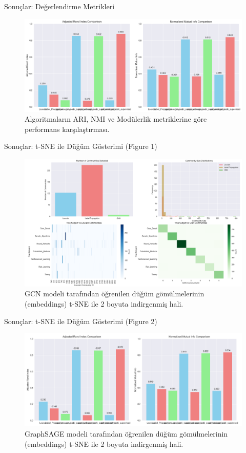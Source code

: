 \documentclass{beamer}
\begin{document}
\begin{frame}{Sonuçlar: Değerlendirme Metrikleri}
    \begin{figure}
        \includegraphics[width=\textwidth]{../results/evaluation_metrics.png}
        \caption{Algoritmaların ARI, NMI ve Modülerlik metriklerine göre performans karşılaştırması.}
    \end{figure}
\end{frame}

\begin{frame}{Sonuçlar: t-SNE ile Düğüm Gösterimi (Figure 1)}
    \begin{figure}
        \includegraphics[width=\textwidth]{../results/Figure_1.png}
        \caption{GCN modeli tarafından öğrenilen düğüm gömülmelerinin (embeddings) t-SNE ile 2 boyuta indirgenmiş hali.}
    \end{figure}
\end{frame}

\begin{frame}{Sonuçlar: t-SNE ile Düğüm Gösterimi (Figure 2)}
    \begin{figure}
        \includegraphics[width=\textwidth]{../results/Figure_2.png}
        \caption{GraphSAGE modeli tarafından öğrenilen düğüm gömülmelerinin (embeddings) t-SNE ile 2 boyuta indirgenmiş hali.}
    \end{figure}
\end{frame}
\end{document}

